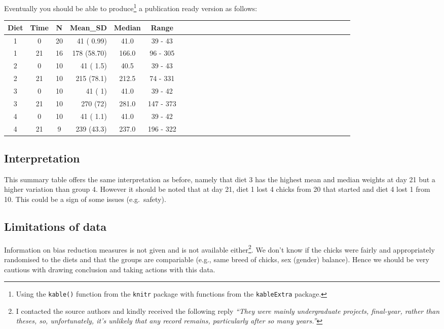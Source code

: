 \documentclass[a4paper,9pt,twocolumn,twoside,printwatermark=false]{pinp}
\begin{document}
Eventually you should be able to produce\footnote{Using the
  \texttt{kable()} function from the \texttt{knitr} package with
  functions from the \texttt{kableExtra} package.} a publication ready
version as follows:

\begin{table}[H]
\centering
\begin{tabular}{cccrccccrccccrccccrccccrccccrc}
\toprule
\textbf{Diet} & \textbf{Time} & \textbf{N} & \textbf{Mean\_SD} & \textbf{Median} & \textbf{Range}\\
\midrule
1 & 0 & 20 & 41 ( 0.99) & 41.0 & 39 - 43\\
\rowcolor{lightgray}  1 & 21 & 16 & 178 (58.70) & 166.0 & 96 - 305\\
2 & 0 & 10 & 41 ( 1.5) & 40.5 & 39 - 43\\
\rowcolor{lightgray}  2 & 21 & 10 & 215 (78.1) & 212.5 & 74 - 331\\
3 & 0 & 10 & 41 ( 1) & 41.0 & 39 - 42\\
\rowcolor{lightgray}  3 & 21 & 10 & 270 (72) & 281.0 & 147 - 373\\
4 & 0 & 10 & 41 ( 1.1) & 41.0 & 39 - 42\\
\rowcolor{lightgray}  4 & 21 & 9 & 239 (43.3) & 237.0 & 196 - 322\\
\bottomrule
\end{tabular}
\end{table}

\subsection{Interpretation}\label{interpretation-5}

This summary table offers the same interpretation as before, namely that
diet 3 has the highest mean and median weights at day 21 but a higher
variation than group 4. However it should be noted that at day 21, diet
1 lost 4 chicks from 20 that started and diet 4 lost 1 from 10. This
could be a sign of some issues (e.g.~safety).

\subsection{Limitations of data}\label{limitations-of-data}

Information on bias reduction measures is not given and is not available
either\footnote{I contacted the source authors and kindly received the
  following reply \emph{``They were mainly undergraduate projects,
  final-year, rather than theses, so, unfortunately, it's unlikely that
  any record remains, particularly after so many years.''}}. We don't
know if the chicks were fairly and appropriately randomised to the diets
and that the groups are compariable (e.g., same breed of chicks, sex
(gender) balance). Hence we should be very cautious with drawing
conclusion and taking actions with this data.
\end{document}
